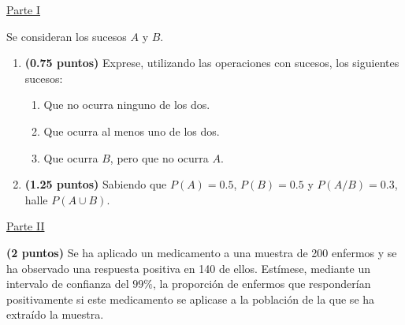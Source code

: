 
\noindent\underline{Parte I}

Se consideran los sucesos $A$ y $B$.
\begin{enumerate}[label=\alph*)]
\item \textbf{(0.75 puntos)} Exprese, utilizando las operaciones con sucesos, los siguientes sucesos:
\begin{enumerate}[label=\arabic*.]
\item Que no ocurra ninguno de los dos.
\item Que ocurra al menos uno de los dos.
\item Que ocurra $B$, pero que no ocurra $A$.
\end{enumerate}
\item \textbf{(1.25 puntos)} Sabiendo que $P(A)=0.5$, $P(B)=0.5$ y $P(A/B)=0.3$, halle $P(A\cup B)$.
\end{enumerate}
\par\noindent\begin{minipage}{\linewidth}
\noindent\underline{Parte II}

\textbf{(2 puntos)} Se ha aplicado un medicamento a una muestra de 200 enfermos y se ha observado una respuesta positiva en 140 de ellos. Estímese, mediante un intervalo de confianza del $99\%$, la proporción de enfermos que responderían positivamente si este medicamento se aplicase a la población de la que se ha extraído la muestra.
\end{minipage}\par
